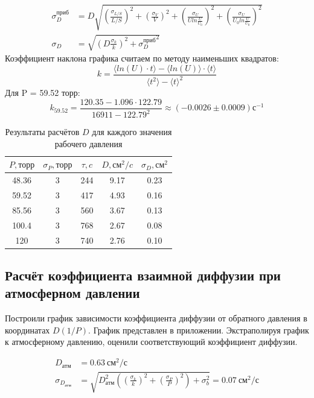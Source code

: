 \documentclass[a4paper, 10pt, twocolumn]{article}
\begin{document}
    \small
    \begin{align*}
        \sigma_D^{приб} &= D \sqrt{\left( \frac{\sigma_{L/S}}{L/S} \right)^2 + \left( \frac{\sigma_V}{V} \right)^2 + \left( \frac{\sigma_U}{U ln \frac{U}{U_0}} \right)^2 + \left( \frac{\sigma_U}{U_0 ln \frac{U}{U_0}} \right)^2}\\
        \sigma_D &= \sqrt{\left( D \frac{\sigma_k}{k} \right)^2 + {\sigma_D^{приб}}^2}
    \end{align*}
    \normalsize
    Коэффициент наклона графика считаем по методу наименьших квадратов:
    $$k = \frac{\langle ln(U) \cdot t\rangle - \langle ln(U)\rangle \cdot \langle t \rangle}{\langle t^2 \rangle - \langle t \rangle^2}$$
    Для P = 59.52 торр:
    $$k_{59.52} = \frac{120.35 - 1.096 \cdot 122.79}{16911 - 122.79^2} \approx (-0.0026 \pm 0.0009) \text{с}^{-1}$$
    \begin{table}[!ht]
        \centering
        \begin{tabular}{|c|c|c|c|c|}
        \hline
            $P, \text{торр}$ & $\sigma_P, \text{торр}$ & $ \tau, c $ &$D, \text{см}^2/c$ & $\sigma_D, \text{см}^2$ \\ \hline
            48.36  & 3 & 244 & 9.17 & 0.23 \\ \hline
            59.52  & 3 & 417 & 4.93 & 0.16 \\ \hline
            85.56  & 3 & 560 & 3.67 & 0.13 \\ \hline
            100.4  & 3 & 768 & 2.67 & 0.08 \\ \hline
            120 & 3 & 740 & 2.76 & 0.10 \\ \hline
        \end{tabular}

        \caption{Результаты расчётов $D$ для каждого значения рабочего давления}
        \label{coeffs}
    \end{table}

\subsection{Расчёт коэффициента взаимной диффузии при атмосферном давлении}

    Построили график зависимости коэффициента диффузии от обратного давления в координатах $D(1/P)$. График представлен в приложении. Экстраполируя график к атмосферному давлению, оценили соответствующий коэффициент диффузии.

    \begin{align*}
        D_{атм} &= 0.63~\text{см}^2/\text{с}\\
        \sigma_{D_{атм}} &=  \sqrt{ D_{атм}^2 \left( \left( \frac{\sigma_k}{k} \right)^2 + \left( \frac{\sigma_P}{P} \right)^2 \right) + \sigma_b^2} = 0.07~\text{см}^2/\text{с}
    \end{align*}
\end{document}
